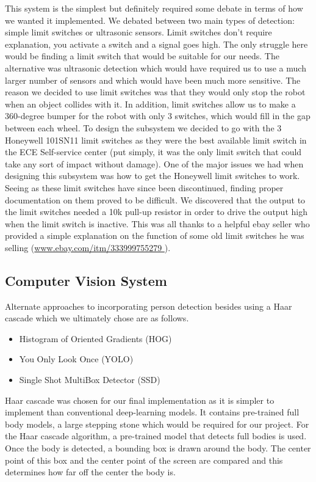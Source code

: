 \documentclass{report}
\begin{document}
    This system is the simplest but definitely required some debate in terms of how we wanted it implemented. We debated between two main types of detection: simple limit switches or ultrasonic sensors. Limit switches don't require explanation, you activate a switch and a signal goes high. The only struggle here would be finding a limit switch that would be suitable for our needs. The alternative was ultrasonic detection which would have required us to use a much larger number of sensors and which would have been much more sensitive. The reason we decided to use limit switches was that they would only stop the robot when an object collides with it. In addition, limit switches allow us to make a 360-degree bumper for the robot with only 3 switches, which would fill in the gap between each wheel. To design the subsystem we decided to go with the 3 Honeywell 101SN11 limit switches as they were the best available limit switch in the ECE Self-service center (put simply, it was the only limit switch that could take any sort of impact without damage). One of the major issues we had when designing this subsystem was how to get the Honeywell limit switches to work. Seeing as these limit switches have since been discontinued, finding proper documentation on them proved to be difficult. We discovered that the output to the limit switches needed a 10k pull-up resistor in order to drive the output high when the limit switch is inactive. This was all thanks to a helpful ebay seller who provided a simple explanation on the function of some old limit switches he was selling (\url{www.ebay.com/itm/333999755279 }).
    
    \subsection{Computer Vision System}
    Alternate approaches to incorporating person detection besides using a Haar cascade which we ultimately chose are as follows.
    
    \begin{itemize}
      \item Histogram of Oriented Gradients (HOG)
      \item You Only Look Once (YOLO)
      \item Single Shot MultiBox Detector (SSD)
    \end{itemize}
    
    Haar cascade was chosen for our final implementation as it is simpler to implement than conventional deep-learning models. It contains pre-trained full body models, a large stepping stone which would be required for our project. For the Haar cascade algorithm, a pre-trained model that detects full bodies is used. Once the body is detected, a bounding box is drawn around the body. The center point of this box and the center point of the screen are compared and this determines how far off the center the body is.
    
\end{document}

